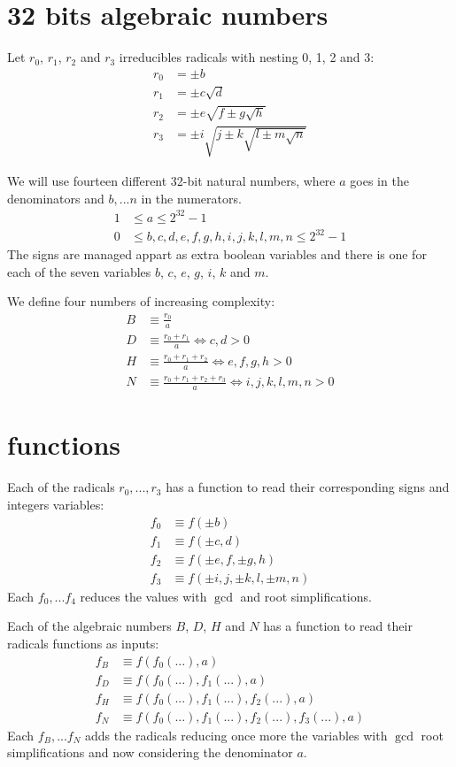 \documentclass{article}
\begin{document}
\section{32 bits algebraic numbers}

Let $r_0$, $r_1$, $r_2$ and $r_3$ irreducibles radicals with nesting 0, 1, 2 and 3:
\begin{align}
r_0 &= \pm b\\
r_1 &= \pm c\sqrt{d}\\
r_2 &= \pm e\sqrt{f \pm g\sqrt{h}}\\
r_3 &= \pm i\sqrt{j \pm k\sqrt{l \pm m\sqrt{n}}}
\end{align}

We will use fourteen different 32-bit natural numbers, where $a$ goes in the denominators and $b,...n$ 
in the numerators.
\begin{align}
1 &\leq a       \leq 2^{32} - 1\\
0 &\leq b,c,d,e,f,g,h,i,j,k,l,m,n \leq 2^{32} - 1
\end{align}
The signs are managed appart as extra boolean variables and there is one for each of the seven variables
$b$, $c$, $e$, $g$, $i$, $k$ and $m$.

We define four numbers of increasing complexity:
\begin{align}
B &\equiv \frac{r_0}{a} \\
D &\equiv \frac{r_0 + r_1}{a} \iff c,d > 0 \\
H &\equiv \frac{r_0 + r_1 + r_2}{a} \iff e,f,g,h > 0 \\
N &\equiv \frac{r_0 + r_1 + r_2 + r_3}{a} \iff i,j,k,l,m,n > 0
\end{align}


\section{functions}
Each of the radicals $r_0,...,r_3$ has a function to read their corresponding signs and integers variables:
\begin{align}
f_0 &\equiv f(\pm b)\\
f_1 &\equiv f(\pm c, d)\\
f_2 &\equiv f(\pm e, f, \pm g, h)\\
f_3 &\equiv f(\pm i, j, \pm k, l, \pm m, n)
\end{align}
Each $f_0,...f_4$ reduces the values with $\gcd$ and root simplifications.

Each of the algebraic numbers $B$, $D$, $H$ and $N$ has a function to read their radicals functions as inputs:
\begin{align}
f_B &\equiv f(f_0(...), a)\\
f_D &\equiv f(f_0(...), f_1(...), a)\\
f_H &\equiv f(f_0(...), f_1(...), f_2(...), a)\\
f_N &\equiv f(f_0(...), f_1(...), f_2(...), f_3(...), a)
\end{align}
Each $f_B,...f_N$ adds the radicals reducing once more the variables with $\gcd$ root simplifications
and now considering the denominator $a$.
\end{document}
